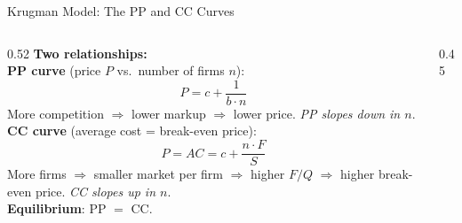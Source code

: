 \documentclass[aspectratio=169]{beamer}
\begin{document}
\begin{frame}{Krugman Model: The PP and CC Curves}
\begin{columns}
\begin{column}{0.52\textwidth}
\textbf{Two relationships:}\\[0.3em]
\textbf{PP curve} (price $P$ vs.\ number of firms $n$):
\[P = c + \frac{1}{b \cdot n}\]
More competition $\Rightarrow$ lower markup $\Rightarrow$ lower price. \emph{PP slopes down in $n$}.\\[0.4em]
\textbf{CC curve} (average cost = break-even price):
\[P = AC = c + \frac{n \cdot F}{S}\]
More firms $\Rightarrow$ smaller market per firm $\Rightarrow$ higher $F/Q$ $\Rightarrow$ higher break-even price. \emph{CC slopes up in $n$}.\\[0.3em]
\textbf{Equilibrium}: PP $=$ CC.
\end{column}
\begin{column}{0.45\textwidth}
\end{column}
\end{columns}
\end{frame}
\end{document}
